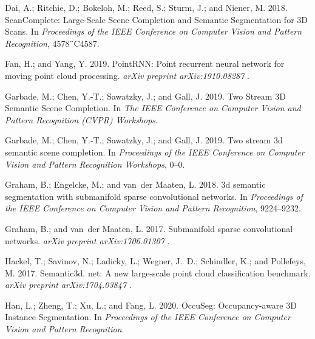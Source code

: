 \documentclass[letterpaper]{article} \usepackage{aaai21}  \usepackage{times}  \usepackage{helvet} \usepackage{courier}  \usepackage[hyphens]{url}  \usepackage{graphicx} \urlstyle{rm} \def\UrlFont{\rm}  \usepackage{natbib}  \usepackage{booktabs}
\begin{document}
\begin{thebibliography}{48}
Dai, A.; Ritchie, D.; Bokeloh, M.; Reed, S.; Sturm, J.; and Niener, M. 2018.
\newblock ScanComplete: Large-Scale Scene Completion and Semantic Segmentation
  for 3D Scans.
\newblock In \emph{Proceedings of the IEEE Conference on Computer Vision and
  Pattern Recognition}, 4578¨C4587.

Fan, H.; and Yang, Y. 2019.
\newblock PointRNN: Point recurrent neural network for moving point cloud
  processing.
\newblock \emph{arXiv preprint arXiv:1910.08287} .

Garbade, M.; Chen, Y.-T.; Sawatzky, J.; and Gall, J. 2019{}.
\newblock Two Stream 3D Semantic Scene Completion.
\newblock In \emph{The IEEE Conference on Computer Vision and Pattern
  Recognition (CVPR) Workshops}.

Garbade, M.; Chen, Y.-T.; Sawatzky, J.; and Gall, J. 2019{}.
\newblock Two stream 3d semantic scene completion.
\newblock In \emph{Proceedings of the IEEE Conference on Computer Vision and
  Pattern Recognition Workshops}, 0--0.

Graham, B.; Engelcke, M.; and van~der Maaten, L. 2018.
\newblock 3d semantic segmentation with submanifold sparse convolutional
  networks.
\newblock In \emph{Proceedings of the IEEE Conference on Computer Vision and
  Pattern Recognition}, 9224--9232.

Graham, B.; and van~der Maaten, L. 2017.
\newblock Submanifold sparse convolutional networks.
\newblock \emph{arXiv preprint arXiv:1706.01307} .

Hackel, T.; Savinov, N.; Ladicky, L.; Wegner, J.~D.; Schindler, K.; and
  Pollefeys, M. 2017.
\newblock Semantic3d. net: A new large-scale point cloud classification
  benchmark.
\newblock \emph{arXiv preprint arXiv:1704.03847} .

Han, L.; Zheng, T.; Xu, L.; and Fang, L. 2020.
\newblock OccuSeg: Occupancy-aware 3D Instance Segmentation.
\newblock In \emph{Proceedings of the IEEE Conference on Computer Vision and
  Pattern Recognition}.


\end{thebibliography}
\end{document}
